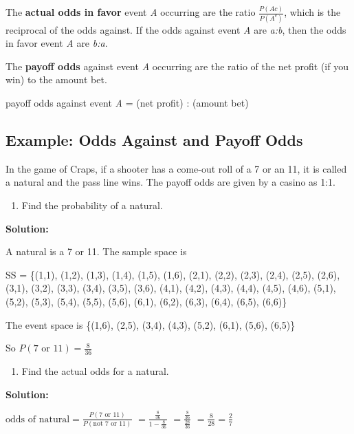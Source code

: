 \documentclass[
]{book}
\providecommand{\tightlist}{%
  \setlength{\itemsep}{0pt}\setlength{\parskip}{0pt}}
\begin{document}
The \textbf{actual odds in favor} event \emph{A} occurring are the ratio \(\frac{P(Ac)}{P(A^c)}\), which is the reciprocal of the odds against. If the odds against event \emph{A} are \emph{a:b}, then the odds in favor event \emph{A} are \emph{b:a}.

The \textbf{payoff odds} against event \emph{A} occurring are the ratio of the net profit (if you win) to the amount bet.

payoff odds against event \emph{A} = (net profit) : (amount bet)

\hypertarget{example-odds-against-and-payoff-odds}{%
\subsection{Example: Odds Against and Payoff Odds}\label{example-odds-against-and-payoff-odds}}

In the game of Craps, if a shooter has a come-out roll of a 7 or an 11, it is called a natural and the pass line wins. The payoff odds are given by a casino as 1:1.

\begin{enumerate}
\def\labelenumi{\alph{enumi}.}
\tightlist
\item
  Find the probability of a natural.
\end{enumerate}

\textbf{Solution:}

A natural is a 7 or 11. The sample space is

SS = \{(1,1), (1,2), (1,3), (1,4), (1,5), (1,6),
(2,1), (2,2), (2,3), (2,4), (2,5), (2,6),
(3,1), (3,2), (3,3), (3,4), (3,5), (3,6),
(4,1), (4,2), (4,3), (4,4), (4,5), (4,6),
(5,1), (5,2), (5,3), (5,4), (5,5), (5,6),
(6,1), (6,2), (6,3), (6,4), (6,5), (6,6)\}

The event space is \{(1,6), (2,5), (3,4), (4,3), (5,2), (6,1), (5,6),
(6,5)\}

So \(P(\text{7 or 11})=\frac{8}{36}\)

\begin{enumerate}
\def\labelenumi{\alph{enumi}.}
\setcounter{enumi}{1}
\tightlist
\item
  Find the actual odds for a natural.
\end{enumerate}

\textbf{Solution:}

\(\text{odds of natural}=\frac{P(\text{7 or 11})}{P(\text{not 7 or 11})}\)
\(=\frac{\frac{8}{36}}{1-\frac{8}{36}}\)
\(=\frac{\frac{8}{36}}{\frac{28}{36}}\)
\(=\frac{8}{28}=\frac{2}{7}\)
\end{document}
